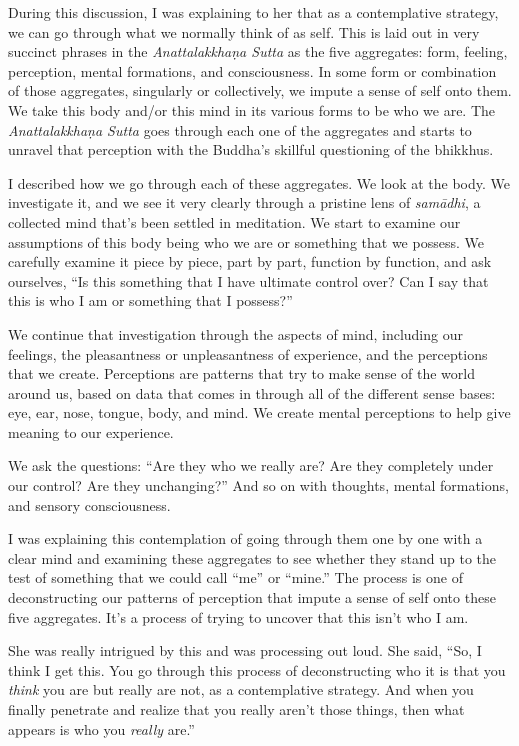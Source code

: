 During this discussion, I was explaining to her that as a contemplative strategy, we can go through what we normally think of as self. This is laid out in very succinct phrases in the \emph{Anattalakkhaṇa Sutta} as the five aggregates: form, feeling, perception, mental formations, and consciousness. In some form or combination of those aggregates, singularly or collectively, we impute a sense of self onto them. We take this body and/or this mind in its various forms to be who we are. The \emph{Anattalakkhaṇa Sutta} goes through each one of the aggregates and starts to unravel that perception with the Buddha's skillful questioning of the bhikkhus.~

I described how we go through each of these aggregates. We look at the body. We investigate it, and we see it very clearly through a pristine lens of \emph{samādhi}, a collected mind that's been settled in meditation. We start to examine our assumptions of this body being who we are or something that we possess. We carefully examine it piece by piece, part by part, function by function, and ask ourselves, ``Is this something that I have ultimate control over? Can I say that this is who I am or something that I possess?''~

We continue that investigation through the aspects of mind, including our feelings, the pleasantness or unpleasantness of experience, and the perceptions that we create. Perceptions are patterns that try to make sense of the world around us, based on data that comes in through all of the different sense bases: eye, ear, nose, tongue, body, and mind. We create mental perceptions to help give meaning to our experience.

We ask the questions: ``Are they who we really are? Are they completely under our control? Are they unchanging?'' And so on with thoughts, mental formations, and sensory consciousness.~

I was explaining this contemplation of going through them one by one with a clear mind and examining these aggregates to see whether they stand up to the test of something that we could call ``me'' or ``mine.'' The process is one of deconstructing our patterns of perception that impute a sense of self onto these five aggregates. It's a process of trying to uncover that this isn't who I am.

She was really intrigued by this and was processing out loud. She said, ``So, I think I get this. You go through this process of deconstructing who it is that you \emph{think} you are but really are not, as a contemplative strategy. And when you finally penetrate and realize that you really aren't those things, then what appears is who you \emph{really} are.''~

